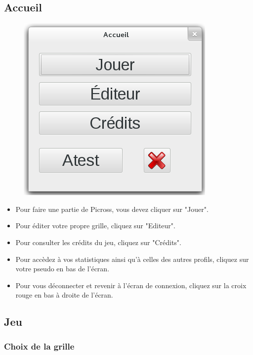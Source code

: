 \documentclass[a4paper, 12pt, twoside]{article}
\begin{document}
\subsection{Accueil}

\begin{figure}[H]
  \center
  \includegraphics[scale=0.6]{accueil.png}
  \label{accueil}
\end{figure}

\begin{itemize}\setlength{\itemsep}{1mm}
 \item Pour faire une partie de Picross, vous devez cliquer sur "Jouer".
 \item Pour éditer votre propre grille, cliquez sur "Editeur".
 \item Pour consulter les crédits du jeu, cliquez sur "Crédits".
 \item Pour accèdez à vos statistiques ainsi qu'à celles des autres profils, cliquez sur votre pseudo en bas de l'écran.
 \item Pour vous déconnecter et revenir à l'écran de connexion, cliquez sur la croix rouge en bas à droite de l'écran.
\end{itemize}


\subsection{Jeu}
\subsubsection{Choix de la grille}
\end{document}
